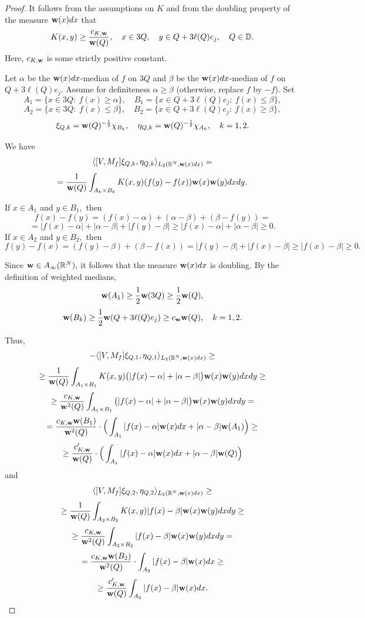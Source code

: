 \documentclass{amsart}
\begin{document}
\begin{proof} It follows from the assumptions on $K$ and from the doubling property of the measure ${\bf w}(x)dx$ that
$$K(x,y)\geq \frac{c_{K,{\bf w}}}{{\bf w}(Q)},\quad x\in 3Q,\quad y\in Q+3\ell(Q)e_j,\quad Q\in\mathbb{D}.$$
Here, $c_{K,{\bf w}}$ is some strictly positive constant.

Let $\alpha$ be the ${\bf w}(x)dx$-median of $f$ on $3Q$ and $\beta$ be the ${\bf w}(x)dx$-median of $f$ on $Q+3\ell(Q)e_j.$ Assume for definiteness $\alpha\geq\beta$ (otherwise, replace $f$ by $-f$). Set
$$A_1=\{x\in 3Q:\ f(x)\geq\alpha\}, \quad B_1=\{x\in Q+3\ell(Q)e_j: \ f(x)\leq\beta\},$$
$$A_2=\{x\in 3Q:\ f(x)\leq\beta\},\quad B_2=\{x\in Q+3\ell(Q)e_j: \ f(x)\geq\beta\},$$
$$\xi_{Q,k}={\bf w}(Q)^{-\frac12}\chi_{B_k},\quad \eta_{Q,k}={\bf w}(Q)^{-\frac12}\chi_{A_k},\quad k=1,2.$$

We have
$$\langle[V,M_f]\xi_{Q,k},\eta_{Q,k}\rangle_{L_2(\mathbb{R}^N,{\bf w}(x)dx)}=$$
$$=\frac1{{\bf w}(Q)}\int_{A_k\times B_k}K(x,y)(f(y)-f(x)){\bf w}(x){\bf w}(y)dxdy.$$

If $x\in A_1$ and $y\in B_1,$ then 
$$f(x)-f(y)=(f(x)-\alpha)+(\alpha-\beta)+(\beta-f(y))=$$
$$=|f(x)-\alpha|+|\alpha-\beta|+|f(y)-\beta|\geq |f(x)-\alpha|+|\alpha-\beta|\geq0.$$
If $x\in A_2$ and $y\in B_2,$ then
$$f(y)-f(x)=(f(y)-\beta)+(\beta-f(x))=|f(y)-\beta|+|f(x)-\beta|\geq |f(x)-\beta|\geq0.$$

Since ${\bf w}\in A_{\infty}(\mathbb{R}^N),$ it follows that the measure ${\bf w}(x)dx$ is doubling. By the definition of weighted medians,
$${\bf w}(A_1)\geq\frac12{\bf w}(3Q)\geq\frac12{\bf w}(Q),$$
$${\bf w}(B_k)\geq\frac12{\bf w}(Q+3\ell(Q)e_j)\geq c_{\bf w}{\bf w}(Q),\quad k=1,2.$$

Thus,
$$-\langle[V,M_f]\xi_{Q,1},\eta_{Q,1}\rangle_{L_2(\mathbb{R}^N,{\bf w}(x)dx)}\geq$$
$$\geq\frac1{{\bf w}(Q)}\int_{A_1\times B_1}K(x,y)\big(|f(x)-\alpha|+|\alpha-\beta|\big)
{\bf w}(x){\bf w}(y)dxdy\geq$$
$$\geq\frac{c_{K,{\bf w}}}{{\bf w}^2(Q)}\int_{A_1\times B_1}\big(|f(x)-\alpha|+|\alpha-\beta|\big){\bf w}(x){\bf w}(y)dxdy=$$
$$=\frac{c_{K,{\bf w}}{\bf w}(B_1)}{{\bf w}^2(Q)}\cdot
\Big(\int_{A_1}|f(x)-\alpha|{\bf w}(x)dx+|\alpha-\beta|{\bf w}(A_1)\Big)\geq$$
$$\geq\frac{c_{K,{\bf w}}'}{{\bf w}(Q)}\cdot\Big(\int_{A_1}|f(x)-\alpha|{\bf w}(x)dx+|\alpha-\beta|{\bf w}(Q)\Big)$$
and
$$\langle[V,M_f]\xi_{Q,2},\eta_{Q,2}\rangle_{L_2(\mathbb{R}^N,{\bf w}(x)dx)}\geq$$
$$\geq\frac1{{\bf w}(Q)}\int_{A_2\times B_2}K(x,y)|f(x)-\beta|{\bf w}(x){\bf w}(y)dxdy\geq$$
$$\geq\frac{c_{K,{\bf w}}}{{\bf w}^2(Q)}\int_{A_2\times B_2}|f(x)-\beta|{\bf w}(x){\bf w}(y)dxdy=$$
$$=\frac{c_{K,{\bf w}}{\bf w}(B_2)}{{\bf w}^2(Q)}\cdot\int_{A_2}|f(x)-\beta|{\bf w}(x)dx\geq$$
$$\geq\frac{c_{K,{\bf w}}'}{{\bf w}(Q)}\int_{A_2}|f(x)-\beta|{\bf w}(x)dx.$$


\end{proof}
\end{document}
